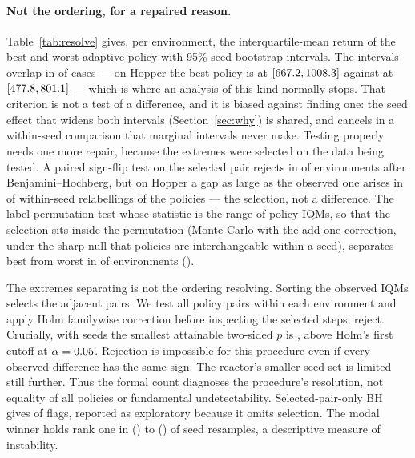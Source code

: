 \documentclass{article}
\begin{document}
\paragraph{Not the ordering, for a repaired reason.}
Table~\ref{tab:resolve} gives, per environment, the interquartile-mean return
of the best and worst adaptive policy with 95\% seed-bootstrap intervals. The
intervals overlap in \OrderingUnresolved{} of \NEnv{} cases --- on Hopper the
best policy is \BestHopper{} at \BestIqmHopper{} $[667.2{},
1008.3{}]$ against \WorstHopper{} at \WorstIqmHopper{} $[477.8{},
801.1{}]$ --- which is where an analysis of this kind normally stops.
That criterion is not a test of a difference, and it is biased against finding
one: the seed effect that widens both intervals (Section~\ref{sec:why}) is
shared, and cancels in a within-seed comparison that marginal intervals never
make. Testing properly needs one more repair, because the extremes were
selected on the data being tested. A paired sign-flip test on the selected
pair rejects in \ExtremesPairedBH{} of \NEnv{} environments after
Benjamini--Hochberg, but on Hopper a gap as large as the observed one arises in
\OmniPHopper{} of within-seed relabellings of the policies --- the selection,
not a difference. The label-permutation test whose statistic is the range of
policy IQMs, so that the selection sits inside the permutation (Monte Carlo
with the add-one correction, under the sharp null that policies are
interchangeable within a seed), separates best from worst in \ExtremesBH{} of
\NEnv{} environments (\ExtremesBHList{}).

The extremes separating is not the ordering resolving. Sorting the observed
IQMs selects the adjacent pairs. We test all \AllPolicyPairs{} policy pairs
within each environment and apply Holm familywise correction
\citep{holm1979sequential} before inspecting the \AdjacentTotal{} selected
steps; \AdjacentSeparated{} reject. Crucially, with \SeedsHopper{} seeds the
smallest attainable two-sided $p$ is \AdjacentPFloor{}, above Holm's first
cutoff \AdjacentHolmCutoff{} at $\alpha=0.05{}$. Rejection is impossible
for this procedure even if every observed difference has the same sign.
The reactor's smaller seed set is limited still further. Thus the formal
count diagnoses the procedure's resolution, not equality of all policies or
fundamental undetectability. Selected-pair-only BH gives
\AdjacentExploratory{} of \AdjacentTotal{} flags, reported as exploratory
because it omits selection. The modal winner holds rank one in
\TopOneProbMin{} (\TopOneProbMinEnv{}) to \TopOneProbMax{}
(\TopOneProbMaxEnv{}) of seed resamples, a descriptive measure of instability.
\end{document}
